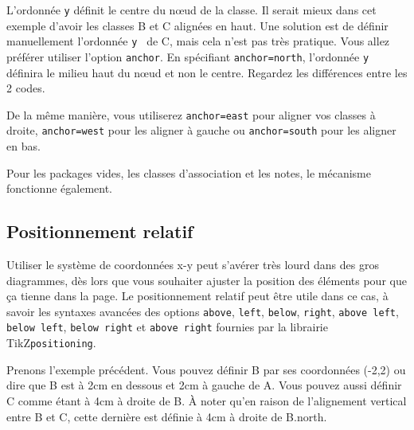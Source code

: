 \documentclass[a4paper,11pt]{report}
\newcommand{\inputTikZ}[1]{%
  }%
\newcommand{\inputTikZ}[1]{%
    \texttt{[image: fig/\#1.pdf]}%
  }%
\newcommand{\TikZ}{{\sc TikZ}}
\begin{document}
\medskip

L'ordonnée {\tt y} définit le centre du n\oe{}ud de la classe. Il serait mieux dans cet exemple d'avoir les classes B et C alignées en haut. Une solution est de définir manuellement l'ordonnée {\tt y } de C, mais cela n'est pas très pratique. Vous allez préférer utiliser l'option {\tt anchor}. En spécifiant {\tt anchor=north}, l'ordonnée {\tt y} définira le milieu haut du n\oe{}ud et non le centre. Regardez les différences entre les 2 codes.

\medskip

\begin{minipage}{0.5\textwidth}

\end{minipage}
\begin{minipage}{0.5\textwidth}
\begin{center}
\inputTikZ{valign2}
\end{center}
\end{minipage}

\medskip

De la même manière, vous utiliserez {\tt anchor=east} pour aligner vos classes à droite, {\tt anchor=west} pour les aligner à gauche ou {\tt anchor=south} pour les aligner en bas.

\medskip

Pour les packages vides, les classes d'association et les notes, le mécanisme fonctionne également.

\subsection{Positionnement relatif}\label{ss.relpos}

Utiliser le système de coordonnées x-y peut s'avérer très lourd dans des gros diagrammes, dès lors que vous souhaiter ajuster la position des éléments pour que ça tienne dans la page. Le positionnement relatif peut être utile dans ce cas, à savoir les syntaxes avancées des options {\tt above}, {\tt left}, {\tt below}, {\tt right}, {\tt above left}, {\tt below left}, {\tt below right} et {\tt above right} fournies par la librairie \TikZ {\tt positioning}.

\medskip

Prenons l'exemple précédent. Vous pouvez définir B par ses coordonnées (-2,2) ou dire que B est à 2cm en dessous et 2cm à gauche de A. Vous pouvez aussi définir C comme étant à 4cm à droite de B. \`{A} noter qu'en raison de l'alignement vertical entre B et C, cette dernière est définie à 4cm à droite de B.north.
\end{document}
